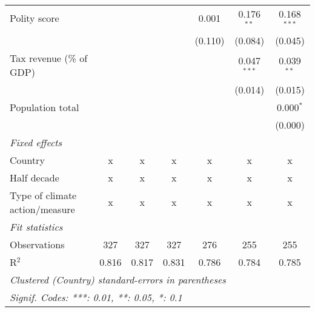 \begin{tabular}{lcccccc}
   Polity score                                                      &         &         &                & 0.001          & 0.176$^{**}$   & 0.168$^{***}$\\   
                                                                     &         &         &                & (0.110)        & (0.084)        & (0.045)\\   
   Tax revenue (\% of GDP)                                           &         &         &                &                & 0.047$^{***}$  & 0.039$^{**}$\\   
                                                                     &         &         &                &                & (0.014)        & (0.015)\\   
   Population total                                                  &         &         &                &                &                & 0.000$^{*}$\\   
                                                                     &         &         &                &                &                & (0.000)\\   
   \emph{Fixed effects}\\
   Country                                                           & x       & x       & x              & x              & x              & x\\  
   Half decade                                                       & x       & x       & x              & x              & x              & x\\  
   Type of climate action/measure                                    & x       & x       & x              & x              & x              & x\\  
   \midrule \emph{Fit statistics}\\
   Observations                                                      & 327     & 327     & 327            & 276            & 255            & 255\\  
   R$^2$                                                             & 0.816   & 0.817   & 0.831          & 0.786          & 0.784          & 0.785\\  
   \midrule
   \multicolumn{7}{l}{\emph{Clustered (Country) standard-errors in parentheses}}\\
   \multicolumn{7}{l}{\emph{Signif. Codes: ***: 0.01, **: 0.05, *: 0.1}}\\
\end{tabular}
\par\endgroup



